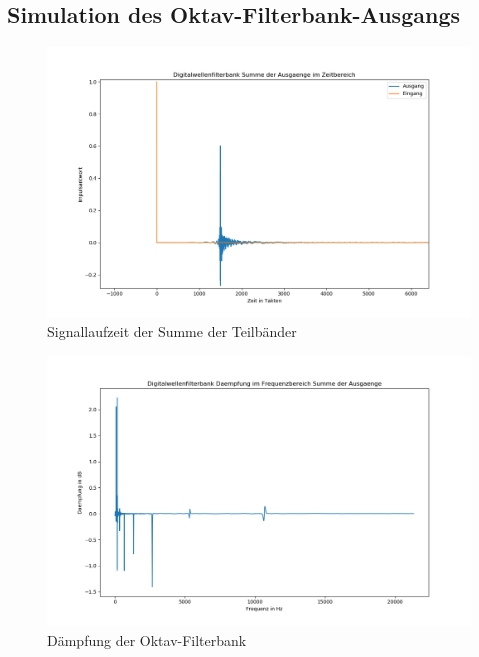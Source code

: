 \subsection{Simulation des Oktav-Filterbank-Ausgangs}

\begin{figure}[h!]
	\centering	\includegraphics[width=14cm]{img/bank_zeit_summe.png}
	\caption{Signallaufzeit der Summe der Teilbänder}
	\label{fig:OktavLaufzeit}
\end{figure}

\begin{figure}[h!]
	\centering	\includegraphics[width=14cm]{img/bank_freq_summe.png}
	\caption{Dämpfung der Oktav-Filterbank}
	\label{fig:AusgangDeampfung}
\end{figure}